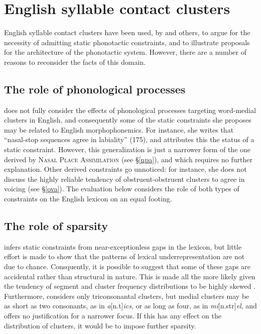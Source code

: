 \section{English syllable contact clusters}

English syllable contact clusters have been used, by \citeauthor{Pierrehumbert1994} and others, to argue for the necessity of admitting static phonotactic constraints, and to illustrate proposals for the architecture of the phonotactic system. 
However, there are a number of reasons to reconsider the facts of this domain.

\subsection{The role of phonological processes}

\citeauthor{Pierrehumbert1994} does not fully consider the effects of phonological processes targeting word-medial clusters in English, and consequently some of the static constraints she proposes may be related to English morphophonemics. 
For instance, she writes that ``nasal-stop sequences agree in labiality'' (175), and attributes this the status of a static constraint. 
However, this generalization is just a narrower form of the one derived by \textsc{Nasal Place Assimilation} (see \S\ref{npa}), and which requires no further explanation. 
Other derived constraints go unnoticed: for instance, she does not discuss the highly reliable tendency of obstruent-obstruent clusters to agree in voicing (see \S\ref{ova}). 
The evaluation below considers the role of both types of constraints on the English lexicon on an equal footing.

\subsection{The role of sparsity}

\citet{Pierrehumbert1994} infers static constraints from near-exceptionless gaps in the lexicon, but little effort is made to show that the patterns of lexical underrepresentation are not due to chance. 
Consquently, it is possible to suggest that some of these gaps 
are accidental rather than structural in nature.
This is made all the more likely given the tendency of segment and cluster frequency distributions to be highly skewed \citep[e.g.,][]{Pande2010,Sigurd1968,Tambovtsev2007,Weiss1961}. 
Furthermore, \citeauthor{Pierrehumbert1994} considers only triconsonantal clusters, but medial clusters may be as short as two consonants, as in \emph{a}[n.t]\emph{ics}, or as long as four, as in \emph{mi}[n.str]\emph{el}, and \citeauthor{Pierrehumbert1994} offers no justification for a narrower focus.
If this has any effect on the distribution of clusters, it would be to impose further sparsity.

